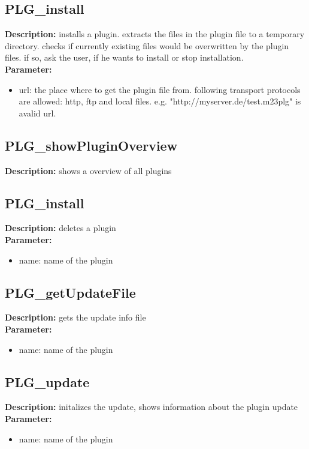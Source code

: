 \subsection{PLG\_install}
\textbf{Description:} installs a plugin. extracts the files in the plugin file to a temporary directory. checks if currently existing files would be overwritten by the plugin files. if so, ask the user, if he wants to install or stop installation.\\
\textbf{Parameter:}
\begin{itemize}
\item url: the place where to get the plugin file from. following transport protocols are allowed: http, ftp and local files. e.g. "http://myserver.de/test.m23plg" is avalid url.
\end{itemize}

\subsection{PLG\_showPluginOverview}
\textbf{Description:} shows a overview of all plugins\\

\subsection{PLG\_install}
\textbf{Description:} deletes a plugin\\
\textbf{Parameter:}
\begin{itemize}
\item name: name of the plugin
\end{itemize}

\subsection{PLG\_getUpdateFile}
\textbf{Description:} gets the update info file\\
\textbf{Parameter:}
\begin{itemize}
\item name: name of the plugin
\end{itemize}

\subsection{PLG\_update}
\textbf{Description:} initalizes the update, shows information about the plugin update\\
\textbf{Parameter:}
\begin{itemize}
\item name: name of the plugin
\end{itemize}

